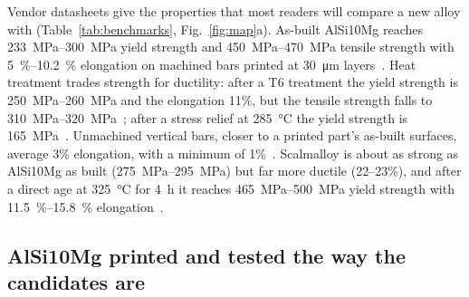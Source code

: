 \documentclass[preprint,12pt]{elsarticle}
\newcommand{\Scal}{Scalmalloy\xspace}
\newcommand{\AlSi}{AlSi10Mg\xspace}
\begin{document}
Vendor datasheets give the properties that most readers will compare a new alloy with (Table~\ref{tab:benchmarks}, Fig.~\ref{fig:map}a).
As-built \AlSi reaches \SIrange{233}{300}{MPa} yield strength and \SIrange{450}{470}{MPa} tensile strength with \SIrange{5}{10.2}{\%} elongation on machined bars printed at \SI{30}{\micro m} layers~\cite{ds_eos,ds_nikon}.
Heat treatment trades strength for ductility: after a T6 treatment the yield strength is \SIrange{250}{260}{MPa} and the elongation 11\%, but the tensile strength falls to \SIrange{310}{320}{MPa}~\cite{ds_eos}; after a stress relief at \SI{285}{\celsius} the yield strength is \SI{165}{MPa}~\cite{ds_nikon}.
Unmachined vertical bars, closer to a printed part's as-built surfaces, average 3\% elongation, with a minimum of 1\%~\cite{ds_nikon}.
\Scal is about as strong as \AlSi as built (\SIrange{275}{295}{MPa}) but far more ductile (22--23\%), and after a direct age at \SI{325}{\celsius} for \SI{4}{h} it reaches \SIrange{465}{500}{MPa} yield strength with \SIrange{11.5}{15.8}{\%} elongation~\cite{ds_colibrium,ds_3dsystems}.


\subsection{\AlSi printed and tested the way the candidates are}
\end{document}
